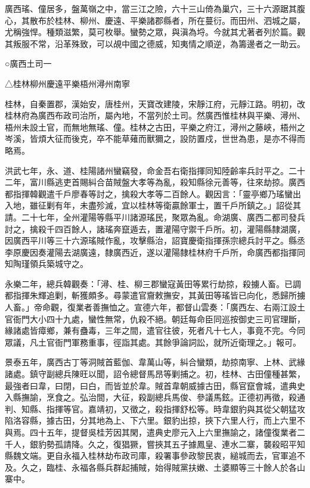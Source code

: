 
\begin{pinyinscope}
廣西瑤、僮居多，盤萬嶺之中，當三江之險，六十三山倚為巢穴，三十六源踞其腹心，其散布於桂林、柳州、慶遠、平樂諸郡縣者，所在蔓衍。而田州、泗城之屬，尤稱強悍。種類滋繁，莫可枚舉。蠻勢之眾，與滇為埒。今就其尤著者列於篇。觀其叛服不常，沿革殊致，可以覘中國之德威，知夷情之順逆，為籌邊者之一助云。

○廣西土司一

△桂林柳州慶遠平樂梧州潯州南寧

桂林，自秦置郡，漢始安，唐桂州，天寶改建陵，宋靜江府，元靜江路。明初，改桂林府為廣西布政司治所，屬內地，不當列於土司。然廣西惟桂林與平樂、潯州、梧州未設土官，而無地無瑤、僮。桂林之古田，平樂之府江，潯州之藤峽，梧州之岑溪，皆煩大征而後克，卒不能草薙而獸獮之，設防置戍，世世為患，是亦不得而略焉。

洪武七年，永、道、桂陽諸州蠻竊發，命金吾右衛指揮同知陸齡率兵討平之。二十二年，富川縣逃吏首賜糾合苗賊盤大孝等為亂，殺知縣徐元善等，往來劫掠。廣西都指揮韓觀遣千戶廖春等討之，擒殺大孝等二百餘人。觀因言：「靈亭鄉乃瑤蠻出入地，雖征剿有年，未盡殄滅，宜以桂林等衛贏餘軍士，置千戶所鎮之。」詔從其請。二十七年，全州灌陽等縣平川諸源瑤民，聚眾為亂。命湖廣、廣西二都司發兵討之，擒殺千四百餘人，諸瑤奔竄遁去，置灌陽守禦千戶所。初，灌陽縣隸湖廣，因廣西平川等三十六源瑤賊作亂，攻擊縣治，詔寶慶衛指揮孫宗總兵討平之。縣丞李原慶因奏灌陽去湖廣遠，隸廣西近，遂以灌陽隸桂林府千戶所，命廣西都指揮同知陶瑾領兵築城守之。

永樂二年，總兵韓觀奏：「潯、桂、柳三郡蠻寇黃田等累行劫掠，殺擄人畜。已調都指揮朱輝追剿，斬獲頗多。尋蒙遣官齎敕撫安，其黃田等瑤皆已向化，悉歸所擄人畜。」帝命觀，復業者善撫恤之。宣德六年，都督山雲奏：「廣西左、右兩江設土官衙門大小四十九處，蠻性無常，仇殺不絕。朝廷每命臣同巡按御史三司官理斷，緣諸處皆瘴鄉，兼有蠱毒，三年之間，遣官往彼，死者凡十七人，事竟不完。今同眾議，凡土官衙門軍務重事，徑詣其處。其餘爭論詞訟，就所近衛理之。」報可。

景泰五年，廣西古丁等洞賊首藍伽、韋萬山等，糾合蠻類，劫掠南寧、上林、武緣諸處。鎮守副總兵陳旺以聞，詔令總督馬昂等剿捕之。初，桂林、古田僮種甚繁，最強者曰韋，曰閉，曰白，而皆並於韋。賊首韋朝威據古田，縣官竄會城，遣典史入縣撫諭，烹食之。弘治間，大征，殺副總兵馬俊、參議馬鉉。正德初再徵，殺通判、知縣、指揮等官。嘉靖初，又徵之，殺指揮舒松等。時韋銀豹與其從父朝猛攻陷洛容縣，據古田，分其地為上、下六里。銀豹出掠，挾下六里人行，而上六里不與焉。四十五年，提督吳桂芳因其閑，遣典史廖元入上六里撫諭之，諸僮復業者二千人，銀豹勢孤請降。久之，復猖獗，嘗挾其五子據鳳皇、連水二寨，襲殺昭平知縣魏文端。更自永福入桂林劫布政司庫，殺署事參政黎民衷，縋城而去，官軍追不及。久之，臨桂、永福各縣兵群起捕賊，始得賊黨扶嫩、土婆顯等三十餘人於各山寨中。


\end{pinyinscope}
